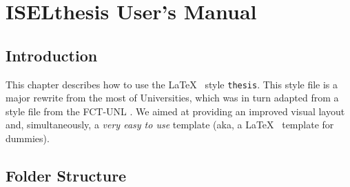 % 
%  
%
\chapter{ISELthesis User's Manual}
\label{cha:users_manual}

\section{Introduction} %
\label{sec:introduction}

This chapter describes how to use the \LaTeX~ style \texttt{thesis{}}. This style file is a major rewrite from the most of Universities, which was in turn adapted from a style file from the FCT-UNL \cite{novathesis-manual}.  We aimed at providing an improved visual layout and, simultaneously, a \emph{very easy to use} template (aka, a  \LaTeX~ template for dummies). 


\section{Folder Structure} %
\label{sec:folder_structure}


